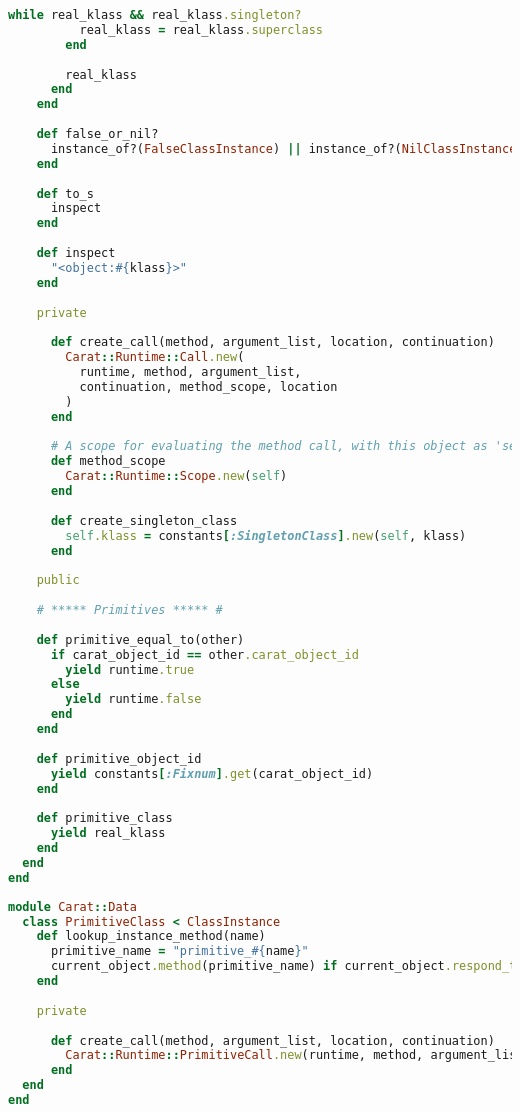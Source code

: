 \begin{lstlisting}[title={\small\ttfamily\bfseries data/object.rb},language=Ruby]
        while real_klass && real_klass.singleton?
          real_klass = real_klass.superclass
        end
        
        real_klass
      end
    end
    
    def false_or_nil?
      instance_of?(FalseClassInstance) || instance_of?(NilClassInstance)
    end
    
    def to_s
      inspect
    end
    
    def inspect
      "<object:#{klass}>"
    end
    
    private
    
      def create_call(method, argument_list, location, continuation)
        Carat::Runtime::Call.new(
          runtime, method, argument_list,
          continuation, method_scope, location
        )
      end
      
      # A scope for evaluating the method call, with this object as 'self'
      def method_scope
        Carat::Runtime::Scope.new(self)
      end
      
      def create_singleton_class
        self.klass = constants[:SingletonClass].new(self, klass)
      end
    
    public
    
    # ***** Primitives ***** #
    
    def primitive_equal_to(other)
      if carat_object_id == other.carat_object_id
        yield runtime.true
      else
        yield runtime.false
      end
    end
    
    def primitive_object_id
      yield constants[:Fixnum].get(carat_object_id)
    end
    
    def primitive_class
      yield real_klass
    end
  end
end

\end{lstlisting}
\begin{lstlisting}[title={\small\ttfamily\bfseries data/primitive.rb},language=Ruby]
module Carat::Data
  class PrimitiveClass < ClassInstance
    def lookup_instance_method(name)
      primitive_name = "primitive_#{name}"
      current_object.method(primitive_name) if current_object.respond_to?(primitive_name)
    end
    
    private
    
      def create_call(method, argument_list, location, continuation)
        Carat::Runtime::PrimitiveCall.new(runtime, method, argument_list, continuation)
      end
  end
end

\end{lstlisting}
